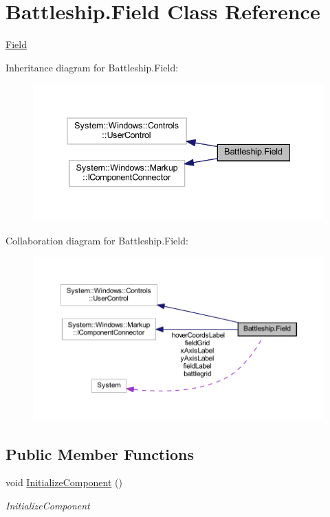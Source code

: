 \hypertarget{class_battleship_1_1_field}{\section{Battleship.\-Field Class Reference}
\label{class_battleship_1_1_field}
}


\hyperlink{class_battleship_1_1_field}{Field}  




Inheritance diagram for Battleship.\-Field\-:\nopagebreak
\begin{figure}[H]
\begin{center}
\leavevmode
\includegraphics[width=338pt]{class_battleship_1_1_field__inherit__graph}
\end{center}
\end{figure}


Collaboration diagram for Battleship.\-Field\-:\nopagebreak
\begin{figure}[H]
\begin{center}
\leavevmode
\includegraphics[width=350pt]{class_battleship_1_1_field__coll__graph}
\end{center}
\end{figure}
\subsection*{Public Member Functions}
\begin{DoxyCompactItemize}
\item 
void \hyperlink{class_battleship_1_1_field_a3ead1b4e04ff890beaf92d2f496ad543}{Initialize\-Component} ()
\begin{DoxyCompactList}\small\item\em Initialize\-Component \end{DoxyCompactList}\end{DoxyCompactItemize}


